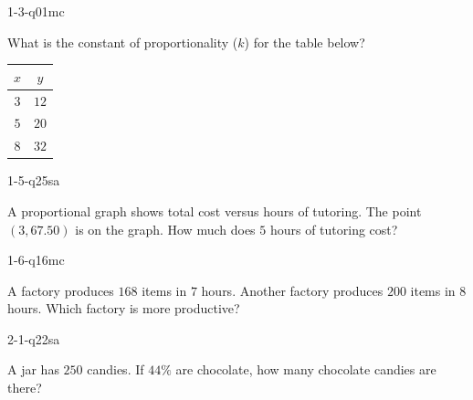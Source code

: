 
\begin{practiceQuestion}{1-3-q01}{mc}
\begin{questionText}
What is the constant of proportionality ($k$) for the table below?

\begin{center}
\begin{tabular}{|c|c|}
\hline $x$ & $y$ \\ \hline $3$ & $12$ \\ $5$ & $20$ \\ $8$ & $32$ \\ \hline
\end{tabular}
\end{center}
\end{questionText}
\end{practiceQuestion}

\begin{practiceQuestion}{1-5-q25}{sa}
\begin{questionText}
A proportional graph shows total cost versus hours of tutoring. The point $(3, 67.50)$ is on the graph. How much does $5$ hours of tutoring cost?
\end{questionText}
\end{practiceQuestion}

\begin{practiceQuestion}{1-6-q16}{mc}
\begin{questionText}
A factory produces $168$ items in $7$ hours. Another factory produces $200$ items in $8$ hours. Which factory is more productive?
\end{questionText}
\end{practiceQuestion}

\begin{practiceQuestion}{2-1-q22}{sa}
\begin{questionText}
A jar has $250$ candies. If $44\%$ are chocolate, how many chocolate candies are there?
\end{questionText}
\end{practiceQuestion}

